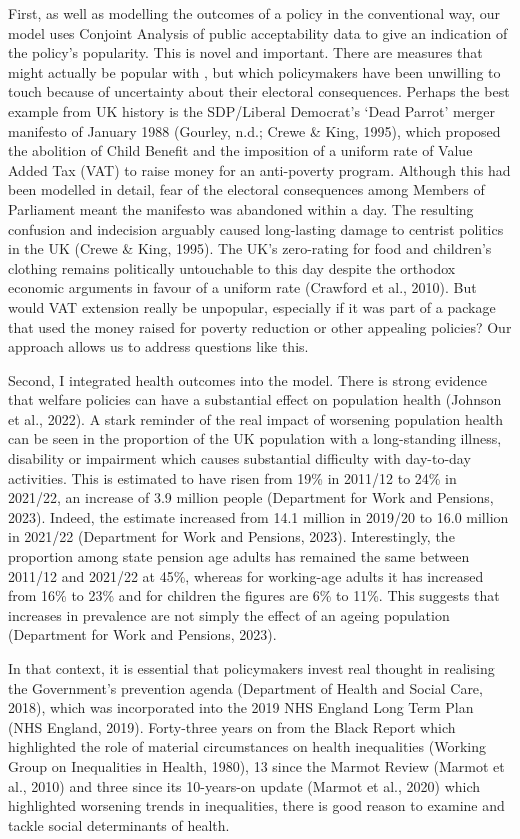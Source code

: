 \documentclass[
  letterpaper,
  DIV=11,
  numbers=noendperiod]{scrartcl}
\begin{document}
First, as well as modelling the outcomes of a policy in the conventional
way, our model uses Conjoint Analysis of public acceptability data to
give an indication of the policy's popularity. This is novel and
important. There are measures that might actually be popular with , but
which policymakers have been unwilling to touch because of uncertainty
about their electoral consequences. Perhaps the best example from UK
history is the SDP/Liberal Democrat's `Dead Parrot' merger manifesto of
January 1988 (Gourley, n.d.; Crewe \& King, 1995), which proposed the
abolition of Child Benefit and the imposition of a uniform rate of Value
Added Tax (VAT) to raise money for an anti-poverty program. Although
this had been modelled in detail, fear of the electoral consequences
among Members of Parliament meant the manifesto was abandoned within a
day. The resulting confusion and indecision arguably caused long-lasting
damage to centrist politics in the UK (Crewe \& King, 1995). The UK's
zero-rating for food and children's clothing remains politically
untouchable to this day despite the orthodox economic arguments in
favour of a uniform rate (Crawford et al., 2010). But would VAT
extension really be unpopular, especially if it was part of a package
that used the money raised for poverty reduction or other appealing
policies? Our approach allows us to address questions like this.

Second, I integrated health outcomes into the model. There is strong
evidence that welfare policies can have a substantial effect on
population health (Johnson et al., 2022). A stark reminder of the real
impact of worsening population health can be seen in the proportion of
the UK population with a long-standing illness, disability or impairment
which causes substantial difficulty with day-to-day activities. This is
estimated to have risen from 19\% in 2011/12 to 24\% in 2021/22, an
increase of 3.9 million people (Department for Work and Pensions, 2023).
Indeed, the estimate increased from 14.1 million in 2019/20 to 16.0
million in 2021/22 (Department for Work and Pensions, 2023).
Interestingly, the proportion among state pension age adults has
remained the same between 2011/12 and 2021/22 at 45\%, whereas for
working-age adults it has increased from 16\% to 23\% and for children
the figures are 6\% to 11\%. This suggests that increases in prevalence
are not simply the effect of an ageing population (Department for Work
and Pensions, 2023).

In that context, it is essential that policymakers invest real thought
in realising the Government's prevention agenda (Department of Health
and Social Care, 2018), which was incorporated into the 2019 NHS England
Long Term Plan (NHS England, 2019). Forty-three years on from the Black
Report which highlighted the role of material circumstances on health
inequalities (Working Group on Inequalities in Health, 1980), 13 since
the Marmot Review (Marmot et al., 2010) and three since its 10-years-on
update (Marmot et al., 2020) which highlighted worsening trends in
inequalities, there is good reason to examine and tackle social
determinants of health.
\end{document}
